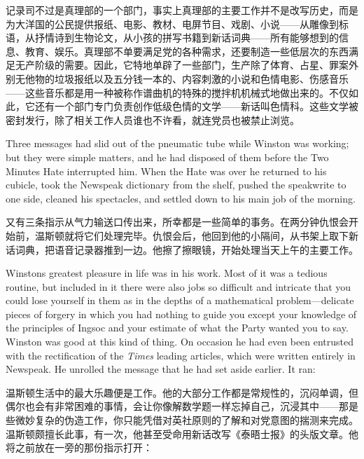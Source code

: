 \begin{paracol}{2}
记录司不过是真理部的一个部门，事实上真理部的主要工作并不是改写历史，而是为大洋国的公民提供报纸、电影、教材、电屏节目、戏剧、小说——从雕像到标语，从抒情诗到生物论文，从小孩的拼写书籍到新话词典——所有能够想到的信息、教育、娱乐。真理部不单要满足党的各种需求，还要制造一些低层次的东西满足无产阶级的需要。因此，它特地单辟了一些部门，生产除了体育、占星、罪案外别无他物的垃圾报纸以及五分钱一本的、内容刺激的小说和色情电影、伤感音乐——这些音乐都是用一种被称作谱曲机的特殊的搅拌机机械式地做出来的。不仅如此，它还有一个部门专门负责创作低级色情的文学——新话叫色情科。这些文学被密封发行，除了相关工作人员谁也不许看，就连党员也被禁止浏览。

\switchcolumn*

Three messages had slid out of the pneumatic tube while Winston was
working; but they were simple matters, and he had disposed of them
before the Two Minutes Hate interrupted him. When the Hate was over he
returned to his cubicle, took the Newspeak dictionary from the shelf,
pushed the speakwrite to one side, cleaned his spectacles, and settled
down to his main job of the morning.

\switchcolumn

又有三条指示从气力输送口传出来，所幸都是一些简单的事务。在两分钟仇恨会开始前，温斯顿就将它们处理完毕。仇恨会后，他回到他的小隔间，从书架上取下新话词典，把语音记录器推到一边。他擦了擦眼镜，开始处理当天上午的主要工作。

\switchcolumn*

Winston\textquotesingle s greatest pleasure in life was in his work.
Most of it was a tedious routine, but included in it there were also
jobs so difficult and intricate that you could lose yourself in them as
in the depths of a mathematical problem---delicate pieces of forgery in
which you had nothing to guide you except your knowledge of the
principles of Ingsoc and your estimate of what the Party wanted you to
say. Winston was good at this kind of thing. On occasion he had even
been entrusted with the rectification of the \emph{Times} leading
articles, which were written entirely in Newspeak. He unrolled the
message that he had set aside earlier. It ran:

\switchcolumn

温斯顿生活中的最大乐趣便是工作。他的大部分工作都是常规性的，沉闷单调，但偶尔也会有非常困难的事情，会让你像解数学题一样忘掉自己，沉浸其中——那是些微妙复杂的伪造工作，你只能凭借对英社原则的了解和对党意图的揣测来完成。温斯顿颇擅长此事，有一次，他甚至受命用新话改写《泰晤士报》的头版文章。他将之前放在一旁的那份指示打开：


\end{paracol}
